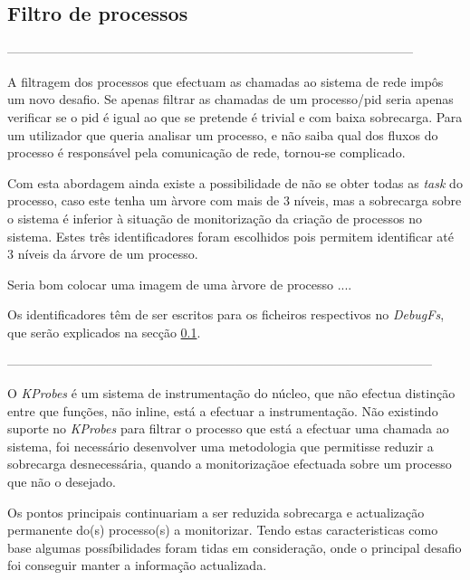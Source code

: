 \subsection{Filtro de processos}
------------------------------------------------------------------------------------------------

A filtragem dos processos que efectuam as chamadas ao sistema de rede impôs um novo desafio.
 Se apenas filtrar as chamadas de um processo/pid seria apenas verificar se o pid é igual ao que se pretende é trivial e com baixa sobrecarga.
 Para um utilizador que queria analisar um processo, e não saiba qual dos fluxos do processo é responsável pela comunicação de rede, tornou-se complicado.

Com esta abordagem ainda existe a possibilidade de não se obter todas as \textit{task} do processo, caso este tenha um àrvore com mais de 3 níveis, mas a sobrecarga sobre o sistema é inferior à situação de monitorização da criação de processos no sistema.
 Estes três identificadores foram escolhidos pois permitem identificar até 3 níveis da árvore de um processo.

Seria bom colocar uma imagem de uma àrvore de processo .... 

Os identificadores têm de ser escritos para os ficheiros respectivos no \textit{DebugFs}, que serão explicados na secção \ref{}.

-----------------------------------------------------------------------------------------------------

O \textit{KProbes} é um sistema de instrumentação do núcleo, que não efectua distinção entre que funções, não inline, está a efectuar a instrumentação.
Não existindo suporte no \textit{KProbes} para filtrar o processo que está a efectuar uma chamada ao sistema, foi necessário desenvolver uma metodologia que permitisse reduzir a sobrecarga desnecessária, quando a monitorizaçãoe efectuada sobre um processo que não o desejado.

Os pontos principais continuariam a ser reduzida sobrecarga e actualização permanente do(s) processo(s) a monitorizar.
Tendo estas caracteristicas como base algumas possíbilidades foram tidas em consideração, onde o principal desafio foi conseguir manter a informação actualizada.

